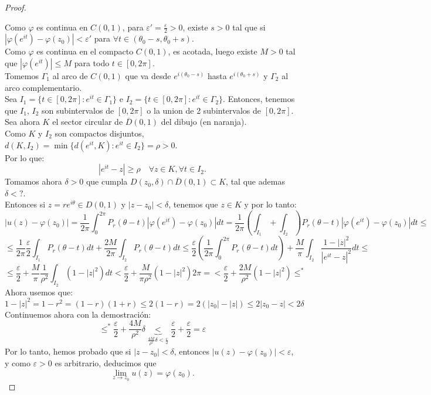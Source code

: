 \begin{proof}
\begin{center}
\begin{tikzpicture}
        \end{tikzpicture}
    \end{center}
    Como $\varphi$ es continua en $C(0,1)$, para $\varepsilon' = \frac{\varepsilon}{2} > 0$, existe $s > 0$ tal que si $|\varphi(e^{it}) - \varphi(z_0)| < \varepsilon'$ para $ \forall t \in (\theta_0 - s, \theta_0 + s)$.\\
    Como $\varphi$ es continua en el compacto $C(0,1)$, es acotada, luego existe $M > 0$ tal que $|\varphi(e^{it})| \leq M$ para todo $t \in [0,2\pi]$.\\
    Tomemos $\Gamma_1$ al arco de $C(0,1)$ que va desde $e^{i(\theta_0 - s)}$ hasta $e^{i(\theta_0 + s)}$ y $\Gamma_2$ al arco complementario.\\
    Sea $I_1 = \{ t \in [0,2\pi] : e^{it} \in \Gamma_1 \}$ e $I_2 = \{ t \in [0,2\pi] : e^{it} \in \Gamma_2 \}$. Entonces, tenemos que $I_1$, $I_2$ son subintervalos de $[0,2\pi]$ o la union de 2 subintervalos de $[0,2\pi]$.\\
    Sea ahora $K$ el sector circular de $\overline{D}(0,1)$ del dibujo (en naranja).\\
    Como $K$ y $I_2$ son compactos disjuntos, $d(K,I_2) = \min \{ d(e^{it}, K) : e^{it} \in I_2 \} = \rho > 0$.\\
    Por lo que:
    \[
        |e^{it} - z| \geq \rho \quad \forall z \in K, \forall t \in I_2.
    \]
    Tomamos ahora $\delta > 0$ que cumpla $D(z_0,\delta) \cap \overline{D}(0,1) \subset K$, tal que ademas $\delta < ?$.\\
    Entonces si $z= re^{i\theta} \in D(0,1)$ y $|z - z_0| < \delta$, tenemos que $z \in K$ y por lo tanto:
    \[
        |u(z) - \varphi(z_0)| =
        \frac{1}{2\pi} \int_0^{2\pi} P_r(\theta - t) |\varphi(e^{it}) - \varphi(z_0)| dt =
        \frac{1}{2\pi} \left( \int_{I_1} + \int_{I_2} \right) P_r(\theta - t) |\varphi(e^{it}) - \varphi(z_0)| dt \leq
    \]
    \[
        \leq \frac{1}{2\pi} \frac{\varepsilon}{2} \int_{I_1} P_r(\theta - t) dt + \frac{2M}{2\pi} \int_{I_2} P_r(\theta - t) dt \leq
        \frac{\varepsilon}{2} \left( \frac{1}{2\pi} \int_0^{2\pi} P_r(\theta - t) dt \right) + \frac{M}{\pi} \int_{I_2} \frac{1 - |z|^2}{|e^{it} - z|^2} dt \leq
    \]
    \[
        \leq \frac{\varepsilon}{2} + \frac{M}{\pi} \frac{1}{\rho^2} \int_{I_2} (1 - |z|^2) dt <
        \frac{\varepsilon}{2} + \frac{M}{\pi \rho^2} (1 - |z|^2) 2\pi =
        < \frac{\varepsilon}{2} + \frac{2M}{\rho^2} (1 - |z|^2) \leq^*
    \]
    Ahora usemos que:
    \[
    1 - |z|^2 =
    1 - r^2 =
    (1 - r)(1 + r) \leq
    2(1 - r) =
    2(|z_0| - |z|) \leq
    2|z_0 - z| < 2\delta
    \]
    Continuemos ahora con la demostración:
    \[
        \leq^* \frac{\varepsilon}{2} + \frac{4M}{\rho^2} \delta \underbrace{<}_{\frac{4M}{\rho^2} \delta < \frac{\varepsilon}{2}}
        \frac{\varepsilon}{2} + \frac{\varepsilon}{2} = \varepsilon
    \]
    Por lo tanto, hemos probado que si $|z - z_0| < \delta$, entonces $|u(z) - \varphi(z_0)| < \varepsilon$, y como $\varepsilon > 0$ es arbitrario, deducimos que
    \[
        \lim_{z \to z_0} u(z) = \varphi(z_0).
    \]
\end{proof}

